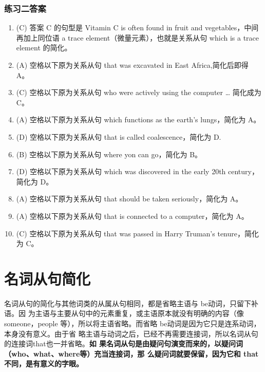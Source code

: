 \subsection{练习二答案}
\begin{enumerate}
\item (C) 答案 C 的句型是 Vitamin C is often found in fruit and vegetables，中间
  再加上同位语 a trace element（微量元素），也就是关系从句 which is a trace
  element 的简化。

\item (A) 空格以下原为关系从句 that was excavated in East Africa,简化后即得 A。

\item (C) 空格以下原为关系从句 who were actively using the computer \ldots{} 简化成为 C。

\item (A) 空格以下原为关系从句 which functions as the earth's lungs，简化为 A。

\item (D) 空格以下原为关系从句 that is called coalescence，简化为 D.

\item (B) 空格以下原为关系从句 where yon can go，简化为 B。

\item  (D) 空格以下原为关系从句 which was discovered in the early 20th century，简化为 D。

\item (A) 空格以下原为关系从句 that should be taken seriously，简化为 A。

\item  (A) 空格以下原为关系从句 that is connected to a computer，简化为 A。

\item (C) 空格以下原为关系从句 that was passed in Harry Truman's tenure，简化为 C。

\end{enumerate}



\chapter{名词从句简化}

名词从句的简化与其他词类的从属从句相同，都是省略主语与 be动词，只留下补语。因
为主语与主要从句中的元素重复，或主语原本就没有明确的内容（像someone，people
等），所以将主语省略。而省略 be动词是因为它只是连系动词，本身没有意义。由于省
略主语与动词之后，已经不再需要连接词，所以名词从句的连接词that也一并省略。\textbf{如
果名词从句是由疑问句演变而来的，以疑问词（who、what、where等）充当连接词，那
么疑问词就要保留，因为它和 that 不同，是有意义的字眼。}

